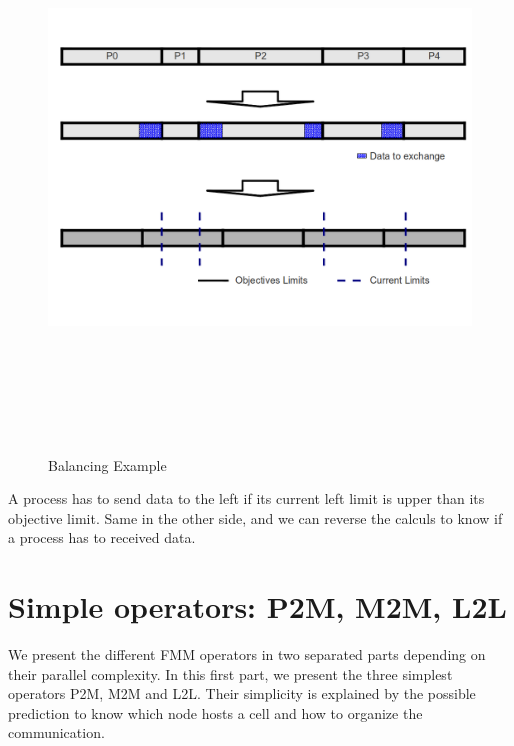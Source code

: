 \documentclass[12pt,letterpaper,titlepage]{report}
\begin{document}
\begin{figure}[h!]
  \begin{center}
    \includegraphics[width=15cm, height=15cm, keepaspectratio=true]{Balance.png}
    \caption{Balancing Example}
  \end{center}
\end{figure}

A process has to send data to the left if its current left limit is upper than its objective limit.
Same in the other side, and we can reverse the calculs to know if a process has to received data.


\chapter{Simple operators: P2M, M2M, L2L}
We present the different FMM operators in two separated parts
depending on their parallel complexity.  In this first part, we
present the three simplest operators P2M, M2M and L2L.  Their
simplicity is explained by the possible prediction to know which node
hosts a cell and how to organize the communication.
\end{document}
